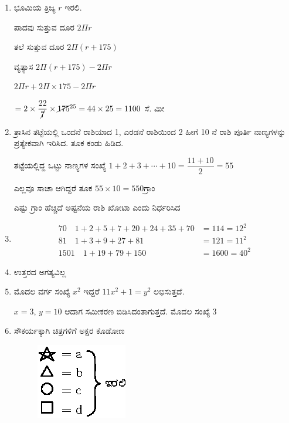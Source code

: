 \begin{enumerate}
\item ಭೂಮಿಯ ತ್ರಿಜ್ಯ $r$ ಇರಲಿ. 

ಪಾದವು ಸುತ್ತುವ ದೂರ $2\Pi r$

ತಲೆ ಸುತ್ತುವ ದೂರ $2\Pi (r + 175)$

ವ್ಯತ್ಯಾಸ $2\Pi (r + 175) - 2\Pi r$

$2\Pi r + 2\Pi\times 175 - 2\Pi r$

$= 2\times \dfrac{22}{\cancel{7}} \times \cancel{175}^{25} = 44\times 25 = 1100$ ಸೆ. ಮೀ 

\item ತ್ರಾಸಿನ ತಟ್ಟೆಯಲ್ಲಿ ಒಂದನೆ ರಾಶಿಯಾದ 1, ಎರಡನೆ ರಾಶಿಯಿಂದ 2 ಹೀಗೆ 10 ನೆ ರಾಶಿ ಪೂರ್ತಿ ನಾಣ್ಯಗಳನ್ನು ಪ್ರತ್ಯೇಕವಾಗಿ ಇರಿಸಿದ. ತೂಕ ಕಂಡು ಹಿಡಿದ. 

ತಟ್ಟೆಯಲ್ಲಿದ್ದ ಒಟ್ಟು ನಾಣ್ಯಗಳ ಸಂಖ್ಯೆ $1 +2 + 3 + \cdots + 10 = \dfrac{11 + 10}{2} = 55$

ಎಲ್ಲವೂ ಸಾಚಾ ಆಗಿದ್ದರೆ ತೂಕ $55\times 10 = 550$ಗ್ರಾಂ 

ಎಷ್ಟು ಗ್ರಾಂ ಹೆಚ್ಚಿದೆ ಅಷ್ಟನೆಯ ರಾಶಿ ಖೋಟಾ ಎಂದು ನಿರ್ಧರಿಸಿದ 

\item 
\begin{align*}
70\quad 1+2+5+7+20+24+35+70 & = 114 = 12^{2}\\
81\quad 1+3+9+27+81 & = 121 = 11^{2}\\
1501\quad 1 +19+79+150 & = 1600 = 40^{2}
\end{align*}

\item ಉತ್ತರದ ಅಗತ್ಯವಿಲ್ಲ 

\item ಮೊದಲ ವರ್ಗ ಸಂಖ್ಯೆ $x^{2}$ ಇದ್ದರೆ $11x^{2} + 1 = y^{2}$ ಲಭಿಸುತ್ತದೆ. 

$x = 3$, $y = 10$ ಆದಾಗ ಸಮೀಕರಣ ಬಿಡಿಸಿದಂತಾಗುತ್ತದೆ. ಮೊದಲ ಸಂಖ್ಯೆ 3

\item  ಸೌಕರ್ಯಕ್ಕಾಗಿ ಚಿತ್ರಗಳಿಗೆ ಅಕ್ಷರ ಕೊಡೋಣ 
\begin{figure}[H]
\centering
\includegraphics{images/chap6/ans30.eps}
\end{figure}


\end{enumerate}
